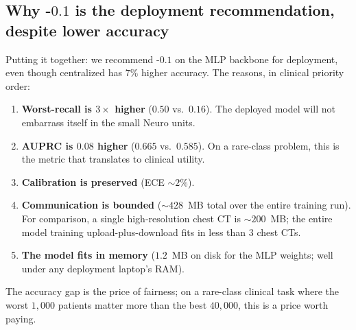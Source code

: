 \subsection{Why \fedprox{}-$0.1$ is the deployment recommendation, despite lower accuracy}
Putting it together: we recommend \fedprox{}-$0.1$ on the MLP backbone for
deployment, even though centralized has $7\%$ higher accuracy. The reasons,
in clinical priority order:
\begin{enumerate}[leftmargin=*,nosep]
    \item \textbf{Worst-recall is $3\!\times$ higher} ($0.50$ vs.\ $0.16$). The
        deployed model will not embarrass itself in the small Neuro units.
    \item \textbf{AUPRC is $0.08$ higher} ($0.665$ vs.\ $0.585$). On a rare-class
        problem, this is the metric that translates to clinical utility.
    \item \textbf{Calibration is preserved} (ECE $\sim 2\%$).
    \item \textbf{Communication is bounded} ($\sim 428$~MB total over the entire
        training run). For comparison, a single high-resolution chest CT is
        $\sim 200$~MB; the entire model training upload-plus-download fits
        in less than $3$ chest CTs.
    \item \textbf{The model fits in memory} ($1.2$~MB on disk for the MLP weights;
        well under any deployment laptop's RAM).
\end{enumerate}
The accuracy gap is the price of fairness; on a rare-class clinical task
where the worst $1{,}000$ patients matter more than the best $40{,}000$, this
is a price worth paying.
